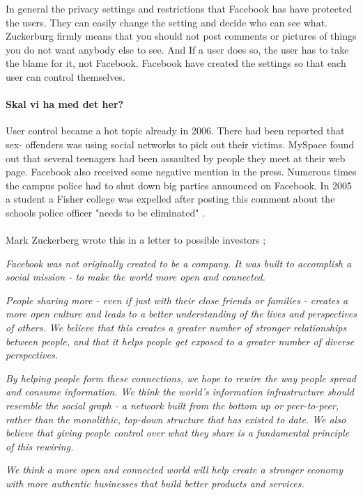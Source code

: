 In general the privacy settings and restrictions that Facebook has have protected the users. They can easily change the setting and decide who can see what. Zuckerburg firmly means that you should not post comments or pictures of things you do not want anybody else to see. And If a user does so, the user has to take the blame for it, not Facebook. Facebook have created the settings so that each user can control themselves. 

\paragraph{Skal vi ha med det her?}
User control became a hot topic already in 2006. There had been reported that sex- offenders was using social networks to pick out their victims. MySpace found out that several teenagers had been assaulted by people they meet at their web page. Facebook also received some negative mention in the press. Numerous times the campus police had to shut down big parties announced on Facebook. In 2005 a student a Fisher college was expelled after posting this comment about the schools police officer "needs to be eliminated" \cite{MeMedia}.

\paragraph{}
Mark Zuckerberg wrote this in a letter to possible investors \cite{LetterToInvestors};

\textit{Facebook was not originally created to be a company. It was built to accomplish a social mission - to make the world more open and connected.}

\textit{People sharing more - even if just with their close friends or families - creates a more open culture and leads to a better understanding of the lives and perspectives of others. We believe that this creates a greater number of stronger relationships between people, and that it helps people get exposed to a greater number of diverse perspectives.}

\textit{By helping people form these connections, we hope to rewire the way people spread and consume information. We think the world's information infrastructure should resemble the social graph - a network built from the bottom up or peer-to-peer, rather than the monolithic, top-down structure that has existed to date. We also believe that giving people control over what they share is a fundamental principle of this rewiring.}

\textit{We think a more open and connected world will help create a stronger economy with more authentic businesses that build better products and services.}
